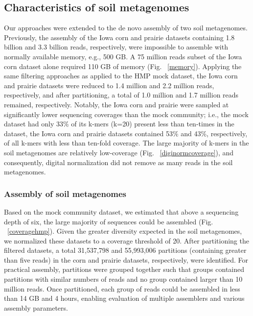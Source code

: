\documentclass[11pt]{article} %
\begin{document}
\subsection{Characteristics of soil metagenomes}

Our approaches were extended to the de novo assembly of two soil metagenomes.  Previously, the assembly of the Iowa corn and prairie datasets containing 1.8 billion and 3.3 billion reads, respectively, were impossible to assemble with normally available memory, e.g., 500 GB.   A 75 million reads subset of the Iowa corn dataset alone required 110 GB of memory (Fig. ~\ref{memory}).  Applying the same filtering approaches as applied to the HMP mock dataset, the Iowa corn and prairie datasets were reduced to 1.4 million and 2.2 million reads, respectively, and after partitioning, a total of 1.0 million and 1.7 million reads remained, respectively.  Notably, the Iowa corn and prairie were sampled at significantly lower sequencing coverages than the mock community; i.e., the mock dataset had only 33\% of its k-mers (k=20) present less than ten-times in the dataset, the Iowa corn and prairie datasets contained 53\% and 43\%, respectively, of all k-mers with less than ten-fold coverage.  The large majority of k-mers in the soil metagenomes are relatively low-coverage (Fig. ~\ref{diginormcoverage}), and consequently, digital normalization did not remove as many reads in the soil metagenomes.

\subsubsection{Assembly of soil metagenomes}

Based on the mock community dataset, we estimated that above a sequencing depth of six, the large majority of sequences could be assembled (Fig. ~\ref{coveragehmp}).  Given the greater diversity expected in the soil metagenomes, we normalized these datasets to a coverage threshold of 20.  After partitioning the filtered datasets, a total 31,537,798 and 55,993,006 partitions (containing greater than five reads) in the corn and prairie datasets, respectively, were identified.  For practical assembly, partitions were grouped together such that groups contained partitions with similar numbers of reads and no group contained larger than 10 million reads.  Once partitioned, each group of reads could be assembled in less than 14 GB and 4 hours, enabling evaluation of multiple assemblers and various assembly parameters.
\end{document}

